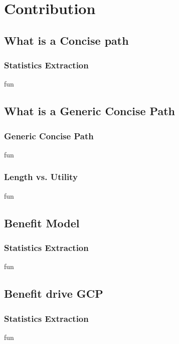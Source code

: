 \section{Contribution}

\subsection{What is a Concise path}

\begin{frame}[shrink=10] %
\frametitle{Statistics Extraction} 

fun

\end{frame}


\subsection{What is a Generic Concise Path}

\begin{frame}[shrink=10] %
\frametitle{Generic Concise Path} 

fun

\end{frame}

\begin{frame}[shrink=10] %
\frametitle{Length vs. Utility} 

fun

\end{frame}

\subsection{Benefit Model}

\begin{frame}[shrink=10] %
\frametitle{Statistics Extraction} 

fun

\end{frame}

\subsection{Benefit drive GCP}

\begin{frame}[shrink=10] %
\frametitle{Statistics Extraction} 

fun

\end{frame}

